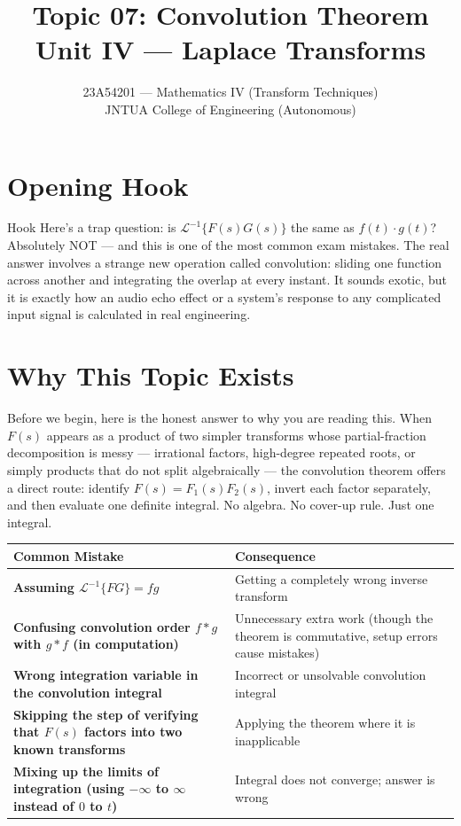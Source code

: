 \documentclass[12pt,a4paper]{article}
\title{Topic 07: Convolution Theorem \\ \large Unit IV --- Laplace Transforms}
\author{23A54201 --- Mathematics IV (Transform Techniques) \\
JNTUA College of Engineering (Autonomous)}
\date{}
\begin{document}
\maketitle
\tableofcontents
\newpage

\section{Opening Hook}

\begin{curiositybox}{Hook}
Here's a trap question: is $\mathcal{L}^{-1}\{F(s)G(s)\}$ the same as $f(t)\cdot g(t)$?
Absolutely NOT --- and this is one of the most common exam mistakes.
The real answer involves a strange new operation called convolution: sliding one function
across another and integrating the overlap at every instant.
It sounds exotic, but it is exactly how an audio echo effect or a system's response to any
complicated input signal is calculated in real engineering.
\end{curiositybox}

\section{Why This Topic Exists}

Before we begin, here is the honest answer to why you are reading this. When $F(s)$ appears
as a product of two simpler transforms whose partial-fraction decomposition is messy ---
irrational factors, high-degree repeated roots, or simply products that do not split
algebraically --- the convolution theorem offers a direct route: identify $F(s)=F_1(s)F_2(s)$,
invert each factor separately, and then evaluate one definite integral.
No algebra. No cover-up rule. Just one integral.

\medskip
\begin{center}
\begin{tabular}{>{\bfseries}p{6.5cm} p{7cm}}
\toprule
\textbf{Common Mistake} & \textbf{Consequence} \\
\midrule
Assuming $\mathcal{L}^{-1}\{FG\}=fg$ & Getting a completely wrong inverse transform \\
\midrule
Confusing convolution order $f{*}g$ with $g{*}f$ (in computation) & Unnecessary extra work (though the theorem is commutative, setup errors cause mistakes) \\
\midrule
Wrong integration variable in the convolution integral & Incorrect or unsolvable convolution integral \\
\midrule
Skipping the step of verifying that $F(s)$ factors into two known transforms & Applying the theorem where it is inapplicable \\
\midrule
Mixing up the limits of integration (using $-\infty$ to $\infty$ instead of $0$ to $t$) & Integral does not converge; answer is wrong \\
\bottomrule
\end{tabular}
\end{center}
\end{document}

